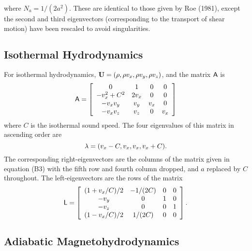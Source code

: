 where $N_{a} = 1/(2a^{2})$.  These are identical to those given by Roe (1981),
except the second and third eigenvectors (corresponding to the transport of
shear motion) have been rescaled to avoid singularities.

\subsection{Isothermal Hydrodynamics}

For isothermal hydrodynamics, ${\bf U} = (\rho, \rho v_{x}, \rho v_{y},
\rho v_{z})$, and the matrix ${\sf A}$ is
\begin{equation}
{\sf A}  = \left[ \begin{array}{cccc}
0 & 1 & 0 & 0 \\
-v_{x}^{2} + C^{2} & 2v_{x} & 0 & 0 \\
-v_{x}v_{y} & v_{y} & v_{x} & 0 \\
-v_{x}v_{z} & v_{z} & 0 & v_{x} \end{array} \right]
\end{equation}
where $C$ is the isothermal sound speed.
The four eigenvalues of this matrix in ascending order are
\begin{equation}
{\bf \lambda} = (v_{x}-C, v_{x}, v_{x}, v_{x}+C).
\end{equation}
The corresponding right-eigenvectors are the columns of the matrix given
in equation (B3) with the fifth row and fourth column dropped, and $a$ replaced
by $C$ throughout.  The left-eigenvectors are the rows of the matrix
\begin{equation}
{\sf L}  = \left[ \begin{array}{cccc}
(1 + v_{x}/C)/2 & -1/(2C) & 0 & 0 \\
-v_{y}          &  0    & 1 & 0 \\
-v_{z}          &  0    & 0 & 1 \\
(1 - v_{x}/C)/2 & 1/(2C)  & 0 & 0 \end{array} \right] .
\end{equation}

\subsection{Adiabatic Magnetohydrodynamics}

